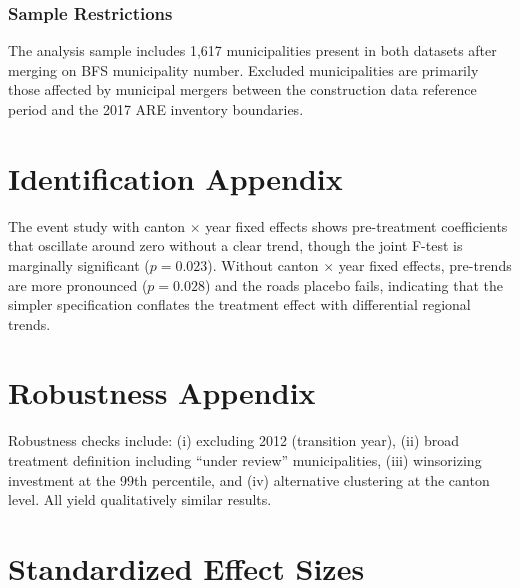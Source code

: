 \documentclass[12pt]{article}
\begin{document}
\subsubsection*{Sample Restrictions} The analysis sample includes 1,617 municipalities present in both datasets after merging on BFS municipality number. Excluded municipalities are primarily those affected by municipal mergers between the construction data reference period and the 2017 ARE inventory boundaries.

\section{Identification Appendix}

The event study with canton $\times$ year fixed effects shows pre-treatment coefficients that oscillate around zero without a clear trend, though the joint F-test is marginally significant ($p = 0.023$). Without canton $\times$ year fixed effects, pre-trends are more pronounced ($p = 0.028$) and the roads placebo fails, indicating that the simpler specification conflates the treatment effect with differential regional trends.

\section{Robustness Appendix}

Robustness checks include: (i) excluding 2012 (transition year), (ii) broad treatment definition including ``under review'' municipalities, (iii) winsorizing investment at the 99th percentile, and (iv) alternative clustering at the canton level. All yield qualitatively similar results.

\section{Standardized Effect Sizes}
\label{sec:sde}


\end{document}
